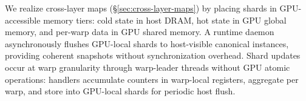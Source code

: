 We realize cross-layer maps (\S\ref{sec:cross-layer-maps}) by placing shards in GPU-accessible memory tiers: cold state in host DRAM, hot state in GPU global memory, and per-warp data in GPU shared memory.
A runtime daemon asynchronously flushes GPU-local shards to host-visible canonical instances, providing coherent snapshots without synchronization overhead.
Shard updates occur at warp granularity through warp-leader threads without GPU atomic operations: handlers accumulate counters in warp-local registers, aggregate per warp, and store into GPU-local shards for periodic host flush.
